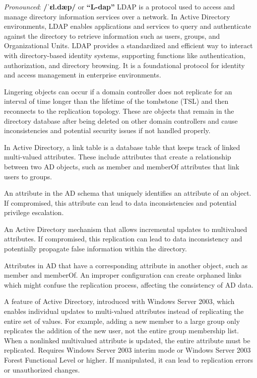 \textit{Pronounced}: \textbf{/ˈɛl.dæp/} or \textbf{“L-dap”}
LDAP is a protocol used to access and manage directory information services over a network. In Active Directory environments, LDAP enables applications and services to query and authenticate against the directory to retrieve information such as users, groups, and Organizational Units. LDAP provides a standardized and efficient way to interact with directory-based identity systems, supporting functions like authentication, authorization, and directory browsing. It is a foundational protocol for identity and access management in enterprise environments.

 Lingering objects can occur if a domain controller does not replicate for an interval of time longer than the lifetime of the tombstone (TSL) and then reconnects to the replication topology. These are objects that remain in the directory database after being deleted on other domain controllers and cause inconsistencies and potential security issues if not handled properly.

 In Active Directory, a link table is a database table that keeps track of linked multi-valued attributes. These include attributes that create a relationship between two AD objects, such as member and memberOf attributes that link users to groups.

 An attribute in the AD schema that uniquely identifies an attribute of an object. If compromised, this attribute can lead to data inconsistencies and potential privilege escalation.

 An Active Directory mechanism that allows incremental updates to multivalued attributes. If compromised, this replication can lead to data inconsistency and potentially propagate false information within the directory.

 Attributes in AD that have a corresponding attribute in another object, such as member and memberOf. An improper configuration can create orphaned links which might confuse the replication process, affecting the consistency of AD data.

 A feature of Active Directory, introduced with Windows Server 2003, which enables individual updates to multi-valued attributes instead of replicating the entire set of values. For example, adding a new member to a large group only replicates the addition of the new user, not the entire group membership list. When a nonlinked multivalued attribute is updated, the entire attribute must be replicated. Requires Windows Server 2003 interim mode or Windows Server 2003 Forest Functional Level or higher. If manipulated, it can lead to replication errors or unauthorized changes.

